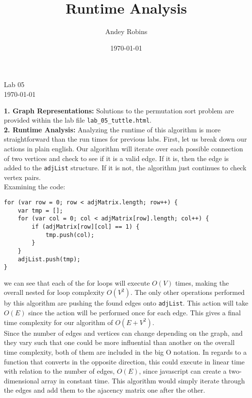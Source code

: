 \documentclass[12pt]{article}
\author{Andey Robins}
\title{Runtime Analysis}
\date{\today{}}
\begin{document}
\begin{center}
    {\Large Lab 05} \\ \today{}
\end{center}
\vspace{5pt}
\textbf{1. Graph Representations:} Solutions to the permutation sort problem are provided within the lab file \texttt{lab\_05\_tuttle.html}. \\

\vspace{5pt}\noindent
\textbf{2. Runtime Analysis:} Analyzing the runtime of this algorithm is more straightforward than the run times for previous labs. First, let us break down our actions in plain english. Our algorithm will iterate over each possible connection of two vertices and check to see if it is a valid edge. If it is, then the edge is added to the \texttt{adjList} structure. If it is not, the algorithm just continues to check vertex pairs. \\

Examining the code:

\begin{center}
\begin{verbatim}
for (var row = 0; row < adjMatrix.length; row++) {
    var tmp = [];
    for (var col = 0; col < adjMatrix[row].length; col++) {
        if (adjMatrix[row][col] == 1) {
            tmp.push(col);
        }
    }
    adjList.push(tmp);
}
\end{verbatim}
\end{center}

we can see that each of the for loops will execute $O(V)$ times, making the overall nested for loop complexity $O(V^2)$. The only other operations performed by this algorithm are pushing the found edges onto \texttt{adjList}. This action will take $O(E)$ since the action will be performed once for each edge. This gives a final time complexity for our algorithm of $O(E + V^2)$. \\

Since the number of edges and vertices can change depending on the graph, and they vary such that one could be more influential than another on the overall time complexity, both of them are included in the big O notation. In regards to a function that converts in the opposite direction, this could execute in linear time with relation to the number of edges, $O(E)$, since javascript can create a two-dimensional array in constant time. This algorithm would simply iterate through the edges and add them to the ajacency matrix one after the other.
\end{document}
